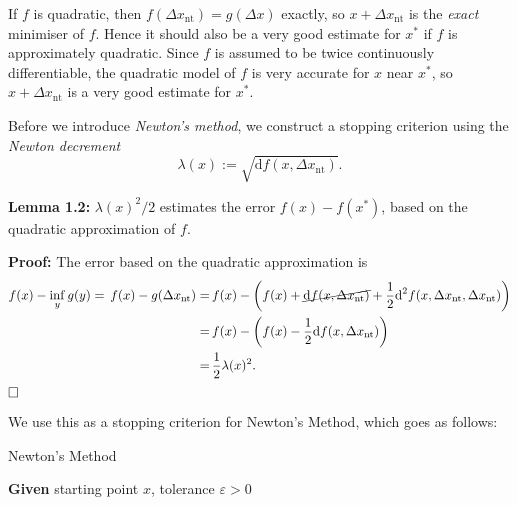 \documentclass[a4paper,11pt]{article}
\begin{document}
If $f$ is quadratic, then $f(\Delta x_{\text{nt}})=g(\Delta x)$ exactly, so $x+\Delta x_{\text{nt}}$ is the \textit{exact} minimiser of $f$. Hence it should also be a very good estimate for $x^*$ if $f$ is approximately quadratic. Since $f$ is assumed to be twice continuously differentiable, the quadratic model of $f$ is very accurate for $x$ near $x^*$, so $x+\Delta x_{\text{nt}}$ is a very good estimate for $x^*$. 

\vspace{3mm}

Before we introduce \textit{Newton's method}, we construct a stopping criterion using the \textit{Newton decrement} $$\lambda(x):=\sqrt{\text{d}f(x,\Delta x_{\text{nt}})}.$$

\textbf{Lemma 1.2:} $\lambda(x)^2/2$ estimates the error $f(x)-f(x^*)$, based on the quadratic approximation of $f$.

\vspace{3mm}

\textbf{Proof:} The error based on the quadratic approximation is \begin{align*}
f(x)-\inf_y g(y)=\,f(x)-g(\Delta x_{\text{nt}})
=\,&f(x)-\left(f(x)+\cancel{\text{d}f(x,\Delta x_{\text{nt}})}+\frac{1}{2}\text{d}^2f(x,\Delta x_{\text{nt}},\Delta x_{\text{nt}})\right)\\
=\,&f(x)-\left(f(x)-\frac{1}{2}\text{d}f(x,\Delta x_{\text{nt}})\right)\\
=\,&\dfrac{1}{2}\lambda(x)^2.
\end{align*}$\hfill\square$

\newpage

We use this as a stopping criterion for Newton's Method, which goes as follows:
 
\vspace{3mm}

\colorbox{blue!10}{\begin{algorithm}[H]\DontPrintSemicolon

\caption{Newton's Method}

 
 \textbf{Given} starting point $x$, tolerance $\varepsilon>0$
 

\end{algorithm}}
\end{document}
